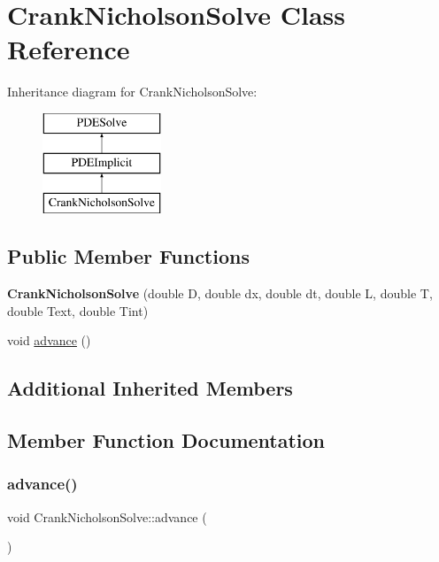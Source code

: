 \hypertarget{class_crank_nicholson_solve}{}\section{Crank\+Nicholson\+Solve Class Reference}
\label{class_crank_nicholson_solve}
Inheritance diagram for Crank\+Nicholson\+Solve\+:\begin{figure}[H]
\begin{center}
\leavevmode
\includegraphics[height=3.000000cm]{class_crank_nicholson_solve}
\end{center}
\end{figure}
\subsection*{Public Member Functions}
\begin{DoxyCompactItemize}
\item 
\mbox{\label{class_crank_nicholson_solve_a0608d2d606626bf02c580f87b5a467ed}} 
{\bfseries Crank\+Nicholson\+Solve} (double D, double dx, double dt, double L, double T, double Text, double Tint)
\item 
void \hyperlink{class_crank_nicholson_solve_a82fe6f2538bc90d62842d26736ba8707}{advance} ()
\end{DoxyCompactItemize}
\subsection*{Additional Inherited Members}


\subsection{Member Function Documentation}
\mbox{\label{class_crank_nicholson_solve_a82fe6f2538bc90d62842d26736ba8707}} 
\subsubsection{\texorpdfstring{advance()}{advance()}}
{\footnotesize\ttfamily void Crank\+Nicholson\+Solve\+::advance (\begin{DoxyParamCaption}{ }\end{DoxyParamCaption})\hspace{0.3cm}{\ttfamily [virtual]}}


